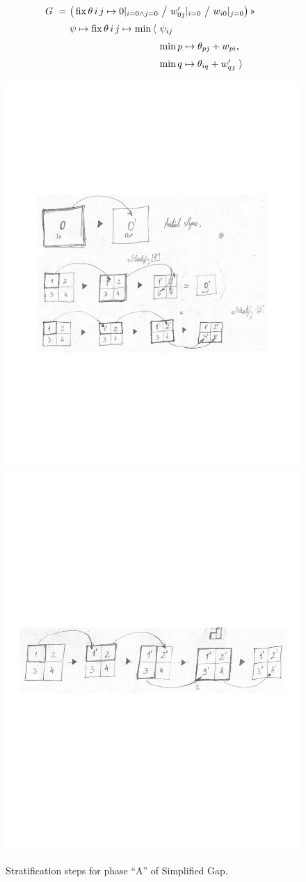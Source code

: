 \begin{center}
\end{center}

\begin{equation}
  \renewcommand\arraystretch{1.5}
  \begin{array}{@{}l@{}l@{}l@{}}
    G ~=~ & \lspan2{\big(\fix \theta\,i\,j\mapsto
	              0|_{i=0\land j=0} ~\big/~ w'_{0j}|_{i=0} ~\big/~ w_{i0}|_{j=0}\big)\applt} \\
	      & \psi\mapsto \fix \theta\,i\,j\mapsto\min\,\langle~ & \psi_{ij} \\
	      & & \min p\mapsto\theta_{pj}+w_{pi}, \\
	      & & \min q\mapsto\theta_{iq}+w'_{qj} ~\rangle
  \end{array}
\end{equation}

\begin{figure}[b]
\includegraphics[width=.47\textwidth]{img/gap-stratify2}\\
\includegraphics[width=.47\textwidth]{img/gap-stratify3}
\caption{
  Stratification steps for phase ``A'' of Simplified Gap.}
\end{figure}

